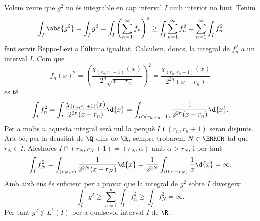 \documentclass[12pt]{article}
\begin{document}
Volem veure que \( g^2 \) no és integrable en cap interval \( I \) amb interior no buit. Tenim
\begin{equation*}
	\int_I \abs{g^2} = \int_I g^2 = \int_I \left(\sum_{n = 1}^{\infty} f_n \right)^2 \geq
	\int_I \sum_{n = 1}^{\infty} f_n^2 = \sum_{n = 1}^{\infty} \int_I f_n^2 
\end{equation*}
fent servir Beppo-Levi a l'última igualtat. Calculem, doncs, la integral de \( f_n^2 \) a
un interval \( I \). Com que
\begin{equation*}
	f_n(x)^2 = \left(\frac{\chi_{(r_n, r_n + 1)}(x)}{2^n \sqrt{x - r_n}}\right)^2 =
	\frac{\chi_{(r_n, r_n + 1)}(x)}{2^{2n} (x - r_n)}
\end{equation*}
es té
\begin{equation*}
	\int_I f_n^2 = \int_I \frac{\chi_{(r_n, r_n + 1)}(x)}{2^{2n} (x - r_n)} \d{x} = \int_{I
	\cap (r_n, r_n + 1)} \frac{1}{2^{2n} (x - r_n)} \d{x}.
\end{equation*}
Per a molts \( n \) aquesta integral serà nu\l.la perquè \( I \) i \( (r_n, r_n + 1) \)
seran disjunts. Ara bé, per la densitat de \( \Q \) dins de \( \R \), sempre trobarem \( N
\in \N \) tal que \( r_N \in \mathring{I} \). Aleshores \( I \cap (r_N, r_N + 1) = (r_N,
\alpha) \) amb \( \alpha > r_N \), i per tant
\begin{equation*}
	\int_I f_N^2 = \int_{(r_N, \alpha)} \frac{1}{2^{2N} (x - r_N)} \d{x} = \frac{1}{2^{2N}}
	\int_{(0, \alpha - r_N)} \frac{1}{x} \d{x} = \infty.
\end{equation*}
Amb això ens és suficient per a provar que la integral de \( g^2 \) sobre \( I \)
divergeix:
\begin{equation*}
	\int_I g^2 \geq \sum_{n = 1}^{\infty} \int_I f_n^2 \geq \int_I f^2_N = \infty. 
\end{equation*}
Per tant \( g^2 \notin L^1(I) \) per a qualsevol interval \( I \) de \( \R \).
\end{document}

